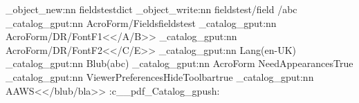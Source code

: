 \documentclass{article}
\begin{document}
\ExplSyntaxOn
\pdf_object_new:nn {fieldstest}{dict}
\pdf_object_write:nn {fieldstest}{/field /abc}
\pdf_catalog_gput:nn {AcroForm/Fields}{fieldstest}
\pdf_catalog_gput:nn {AcroForm/DR/Font}{{F1}{<</A/B>>}}
\pdf_catalog_gput:nn {AcroForm/DR/Font}{{F2}{<</C/E>>}}
\pdf_catalog_gput:nn {Lang}{(en-UK)}
\pdf_catalog_gput:nn {Blub}{(abc)}
\pdf_catalog_gput:nn {AcroForm} {{NeedAppearances}{True}}
\pdf_catalog_gput:nn {ViewerPreferences}{{HideToolbar}{true}}
\pdf_catalog_gput:nn {AA}{{WS}{<</blub/bla>>}}
\use:c{__pdf_Catalog_gpush:}

\ExplSyntaxOff
\end{document}
